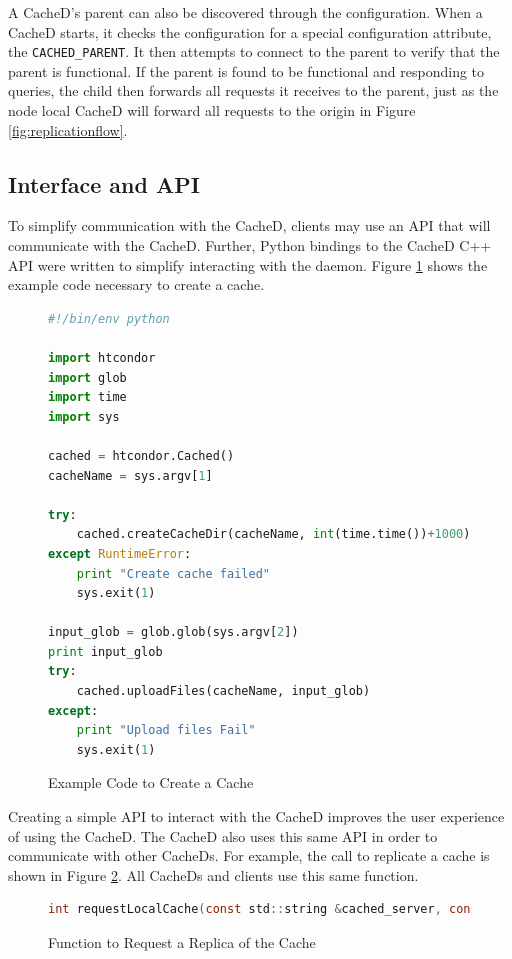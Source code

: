 A CacheD's parent can also be discovered through the configuration.  When a CacheD starts, it checks the configuration for a special configuration attribute, the \texttt{CACHED\_PARENT}.  It then attempts to connect to the parent to verify that the parent is functional.  If the parent is found to be functional and responding to queries, the child then forwards all requests it receives to the parent, just as the node local CacheD will forward all requests to the origin in Figure \ref{fig:replicationflow}.


\subsection{Interface and API}
To simplify communication with the CacheD, clients may use an API that will communicate with the CacheD.  Further, Python bindings to the CacheD C++ API were written to simplify interacting with the daemon.  Figure \ref{fig:createcacheexamplecode} shows the example code necessary to create a cache.

\begin{figure}[ht!]
	
\begin{lstlisting}[language=Python]
#!/bin/env python

import htcondor
import glob
import time
import sys

cached = htcondor.Cached()
cacheName = sys.argv[1]

try:
    cached.createCacheDir(cacheName, int(time.time())+1000)
except RuntimeError:
    print "Create cache failed"
    sys.exit(1)
	
input_glob = glob.glob(sys.argv[2])
print input_glob
try:
    cached.uploadFiles(cacheName, input_glob)
except:
    print "Upload files Fail"
    sys.exit(1)
\end{lstlisting}
\caption{Example Code to Create a Cache}
\label{fig:createcacheexamplecode}
\end{figure}

Creating a simple API to interact with the CacheD improves the user experience of using the CacheD.  The CacheD also uses this same API in order to communicate with other CacheDs.  For example, the call to replicate a cache is shown in Figure \ref{fig:requestlocalcall}.  All CacheDs and clients use this same function.

\begin{figure}[h!]
	\begin{lstlisting}[language=C,backgroundcolor=\color{grey},frame=none]
int requestLocalCache(const std::string &cached_server, const std::string &cached_name, compat_classad::ClassAd& response, CondorError& err)
	\end{lstlisting}
	\caption{Function to Request a Replica of the Cache}
	\label{fig:requestlocalcall}
\end{figure}

